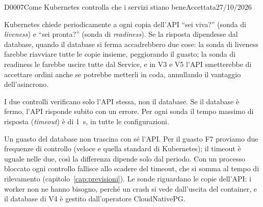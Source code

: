 \begin{decisione}{D0007}{Come Kubernetes controlla che i servizi stiano bene}{Accettata}{27/10/2026}

\contesto
Kubernetes chiede periodicamente a ogni copia dell'API ``sei viva?'' (sonda di \emph{liveness}) e ``sei pronta?'' (sonda di \emph{readiness}). Se la risposta dipendesse dal database, quando il database si ferma accadrebbero due cose: la sonda di liveness farebbe riavviare tutte le copie insieme, peggiorando il guasto; la sonda di readiness le farebbe uscire tutte dal Service, e in V3 e V5 l'API smetterebbe di accettare ordini anche se potrebbe metterli in coda, annullando il vantaggio dell'asincrono.

\scelta
I due controlli verificano solo l'API stessa, non il database. Se il database è fermo, l'API risponde subito con un errore. Per ogni sonda il tempo massimo di risposta (\emph{timeout}) è di 1~s, in tutte le configurazioni.

\conseguenze
Un guasto del database non trascina con sé l'API. Per il guasto F7 proviamo due frequenze di controllo (veloce e quella standard di Kubernetes); il timeout è uguale nelle due, così la differenza dipende solo dal periodo. Con un processo bloccato ogni controllo fallisce allo scadere del timeout, che si somma al tempo di rilevamento (capitolo~\ref{cap:previsioni}). Le sonde riguardano le copie dell'API: i worker non ne hanno bisogno, perché un crash si vede dall'uscita del container, e il database di V4 è gestito dall'operatore CloudNativePG.

\end{decisione}

